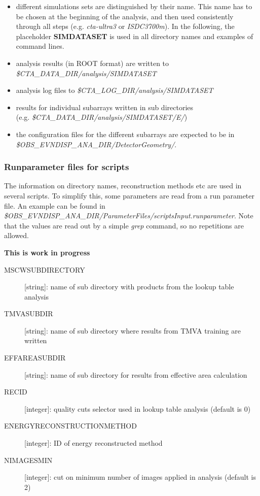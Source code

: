 \documentclass[titlepage,a4paper,twoside,11pt]{report}
\begin{document}
\begin{itemize}
\item different simulations sets are distinguished by their name. This name has to be chosen at the beginning of the analysis, and then used consistently through all steps (e.g. {\it cta-ultra3} or {\it ISDC3700m}). In the following, the placeholder {\bf SIMDATASET} is used in all directory names and examples of command lines.
\item  analysis results (in ROOT format)  are written to \\
{\it \$CTA\_DATA\_DIR/analysis/SIMDATASET}
\item analysis log files to {\it \$CTA\_LOG\_DIR/analysis/SIMDATASET}
\item results for individual subarrays written in sub directories \\
 (e.g. {\it \$CTA\_DATA\_DIR/analysis/SIMDATASET/E/})
 \item the configuration files for the different subarrays are expected to be in \\
 {\it \$OBS\_EVNDISP\_ANA\_DIR/DetectorGeometry/}.
\end{itemize}

\subsubsection{Runparameter files for scripts}
\label{SEC:scriptsRunParameter}

The information on directory names, reconstruction methods etc are used in several scripts. 
To simplify this, some parameters are read from a run parameter file. 
An example can be found in {\it\$OBS\_EVNDISP\_ANA\_DIR/ParameterFiles/scriptsInput.runparameter}.
Note that the values are read out by a simple {\it grep} command, so no repetitions are allowed. 

{\bf This is work in progress}

\begin{description}
\item[MSCWSUBDIRECTORY] [string]: name of sub directory with products from the lookup table analysis
\item[TMVASUBDIR] [string]: name of sub directory where results from TMVA training are written 
\item[EFFAREASUBDIR] [string]: name of sub directory for results from effective area calculation
\item[RECID] [integer]: quality cuts selector used in lookup table analysis (default is 0)
\item[ENERGYRECONSTRUCTIONMETHOD] [integer]: ID of energy reconstructed method
\item[NIMAGESMIN] [integer]: cut on minimum number of images applied in analysis (default is 2)
\end{description} 
\end{document}
